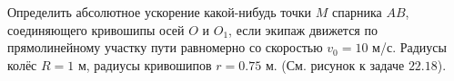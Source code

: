 Определить абсолютное ускорение какой-нибудь точки $M$ спарника $AB$,
соединяющего кривошипы осей $O$ и $O_1$,
если экипаж движется по прямолинейному участку пути равномерно
со скоростью $v_0 = 10$ м/с.
Радиусы колёс $R = 1$ м, радиусы кривошипов $r = 0.75$ м.
(См. рисунок к задаче $22.18$).
